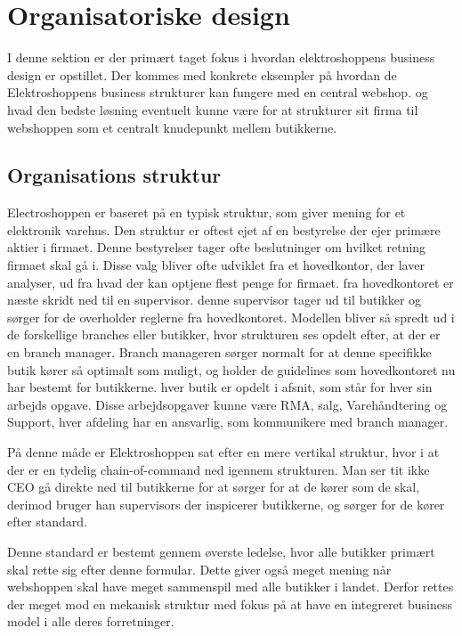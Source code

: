 


\section{ Organisatoriske design}


I denne sektion er der primært taget fokus i hvordan elektroshoppens business design er opstillet. Der kommes med konkrete eksempler på hvordan de Elektroshoppens business strukturer kan fungere med en central webshop. og hvad den bedste løsning eventuelt kunne være for at strukturer sit firma til webshoppen som et centralt knudepunkt mellem butikkerne.


\subsection{Organisations struktur}
Electroshoppen er baseret på en typisk struktur, som giver mening for et elektronik varehus. Den struktur er oftest ejet af en bestyrelse der ejer primære aktier i firmaet. Denne bestyrelser tager ofte beslutninger om hvilket retning firmaet skal gå i. Disse valg bliver ofte udviklet fra et hovedkontor, der laver analyser, ud fra hvad der kan optjene flest penge for firmaet. fra hovedkontoret er næste skridt ned til en supervisor. denne supervisor tager ud til butikker og sørger for de overholder reglerne fra hovedkontoret. Modellen bliver så spredt ud i de forskellige branches eller butikker, hvor strukturen ses opdelt efter, at der er en branch manager. Branch manageren sørger normalt for at denne specifikke butik kører så optimalt som muligt, og holder de guidelines som hovedkontoret nu har bestemt for butikkerne. hver butik er opdelt i afsnit, som står for hver sin arbejds opgave. Disse arbejdsopgaver kunne være RMA, salg, Varehåndtering og Support, hver afdeling har en ansvarlig, som kommunikere med branch manager.
 
På denne måde er Elektroshoppen sat efter en mere vertikal struktur, hvor i at der er en tydelig chain-of-command ned igennem strukturen. Man ser tit ikke CEO gå direkte ned til butikkerne for at sørger for at de kører som de skal, derimod bruger han supervisors der inspicerer butikkerne, og sørger for de kører efter standard.

Denne standard er bestemt gennem øverste ledelse, hvor alle butikker primært skal rette sig efter denne formular. Dette giver også meget mening når webshoppen skal have meget sammenspil med alle butikker i landet. Derfor rettes der meget mod en mekanisk struktur med fokus på at have en integreret business model i alle deres forretninger. 
 
